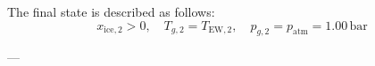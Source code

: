 The final state is described as follows:  
\[
x_{\text{ice},2} > 0, \quad T_{g,2} = T_{\text{EW},2}, \quad p_{g,2} = p_{\text{atm}} = 1.00 \, \text{bar}
\]  

---